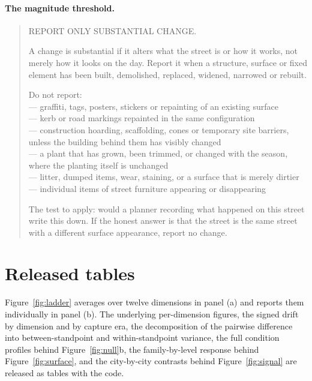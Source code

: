 \paragraph{The magnitude threshold.}
\begin{quote}\small\ttfamily
REPORT ONLY SUBSTANTIAL CHANGE.

A change is substantial if it alters what the street is or how it works, not
merely how it looks on the day. Report it when a structure, surface or fixed
element has been built, demolished, replaced, widened, narrowed or rebuilt.

Do not report: \\
--- graffiti, tags, posters, stickers or repainting of an existing surface \\
--- kerb or road markings repainted in the same configuration \\
--- construction hoarding, scaffolding, cones or temporary site barriers,
unless the building behind them has visibly changed \\
--- a plant that has grown, been trimmed, or changed with the season, where the
planting itself is unchanged \\
--- litter, dumped items, wear, staining, or a surface that is merely dirtier \\
--- individual items of street furniture appearing or disappearing

The test to apply: would a planner recording what happened on this street write
this down. If the honest answer is that the street is the same street with a
different surface appearance, report no change.
\end{quote}

\section{Released tables}

Figure~\ref{fig:ladder} averages over twelve dimensions in panel (a) and reports
them individually in panel (b). The underlying per-dimension figures, the signed
drift by dimension and by capture era, the decomposition of the pairwise
difference into between-standpoint and within-standpoint variance, the full
condition profiles behind Figure~\ref{fig:null}b, the family-by-level response
behind Figure~\ref{fig:surface}, and the city-by-city contrasts behind
Figure~\ref{fig:signal} are released as tables with the code.
